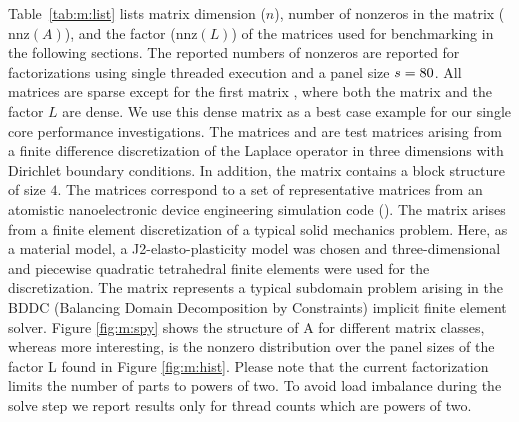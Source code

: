 Table~\ref{tab:m:list} lists matrix dimension ($n$), number of nonzeros in the
matrix ($\text{nnz}(A)$), and the factor (nnz$(L)$) of the matrices used for
benchmarking in the following sections.
The reported numbers of nonzeros
are reported for factorizations using single threaded execution
and a panel size $s = 80$.
All matrices are sparse except
for the first matrix , where both the matrix and
the factor $L$ are dense.
We use this dense matrix as a best case example for our single core performance
investigations.
The matrices  and  are test matrices arising from a
finite difference discretization of the Laplace operator in three dimensions
with Dirichlet boundary conditions.
In addition, the matrix  contains a block structure
of size $4$.
The  matrices correspond to a set of representative matrices from
an atomistic nanoelectronic device engineering simulation code (\cite{luisier2011atomistic}).
The matrix  arises from a finite element discretization of a typical
solid mechanics problem. Here, as a material model, a J2-elasto-plasticity model
was chosen and three-dimensional and piecewise quadratic tetrahedral finite
elements were used for the discretization. The matrix  represents a
typical subdomain problem arising in the BDDC (Balancing Domain Decomposition by
Constraints) implicit finite element solver.
Figure \ref{fig:m:spy} shows the structure of A for different matrix classes, whereas more interesting, is the nonzero distribution over the panel sizes of the factor L found in Figure \ref{fig:m:hist}.
Please note that the current factorization limits the number of parts to powers
of two.
To avoid load imbalance during the solve step we report results only for thread
counts which are powers of two.

